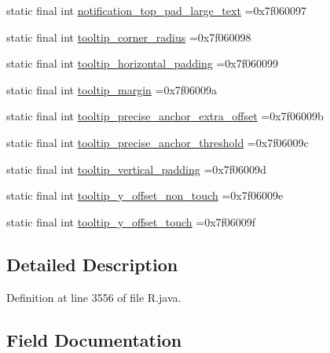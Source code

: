 \begin{DoxyCompactItemize}
\item 
static final int \mbox{\hyperlink{classcom_1_1example_1_1trainawearapplication_1_1_r_1_1dimen_aa305b3727264504b8fcb0244f2ddd322}{notification\+\_\+top\+\_\+pad\+\_\+large\+\_\+text}} =0x7f060097
\item 
static final int \mbox{\hyperlink{classcom_1_1example_1_1trainawearapplication_1_1_r_1_1dimen_a24ce35d20d2c633b36e4e98a21f820c1}{tooltip\+\_\+corner\+\_\+radius}} =0x7f060098
\item 
static final int \mbox{\hyperlink{classcom_1_1example_1_1trainawearapplication_1_1_r_1_1dimen_afe86de8e5123ccd9b256073286cba023}{tooltip\+\_\+horizontal\+\_\+padding}} =0x7f060099
\item 
static final int \mbox{\hyperlink{classcom_1_1example_1_1trainawearapplication_1_1_r_1_1dimen_a202836507ab2bae012f7950fcce07e86}{tooltip\+\_\+margin}} =0x7f06009a
\item 
static final int \mbox{\hyperlink{classcom_1_1example_1_1trainawearapplication_1_1_r_1_1dimen_adb655fd6ba00fb3a8771dbcbc56492a2}{tooltip\+\_\+precise\+\_\+anchor\+\_\+extra\+\_\+offset}} =0x7f06009b
\item 
static final int \mbox{\hyperlink{classcom_1_1example_1_1trainawearapplication_1_1_r_1_1dimen_aae123f8608a36efa189134b229a66b59}{tooltip\+\_\+precise\+\_\+anchor\+\_\+threshold}} =0x7f06009c
\item 
static final int \mbox{\hyperlink{classcom_1_1example_1_1trainawearapplication_1_1_r_1_1dimen_ad5e76d433253ea9861a9abf9288d0d11}{tooltip\+\_\+vertical\+\_\+padding}} =0x7f06009d
\item 
static final int \mbox{\hyperlink{classcom_1_1example_1_1trainawearapplication_1_1_r_1_1dimen_a593c19934fba3183d3b7fb48b85c89b8}{tooltip\+\_\+y\+\_\+offset\+\_\+non\+\_\+touch}} =0x7f06009e
\item 
static final int \mbox{\hyperlink{classcom_1_1example_1_1trainawearapplication_1_1_r_1_1dimen_ae9166e3eb67facc4394aae9b25003cb9}{tooltip\+\_\+y\+\_\+offset\+\_\+touch}} =0x7f06009f
\end{DoxyCompactItemize}


\subsection{Detailed Description}


Definition at line 3556 of file R.\+java.



\subsection{Field Documentation}
\mbox{\label{classcom_1_1example_1_1trainawearapplication_1_1_r_1_1dimen_aeb64eab7955e2b9e571805aa06252df6}} 
